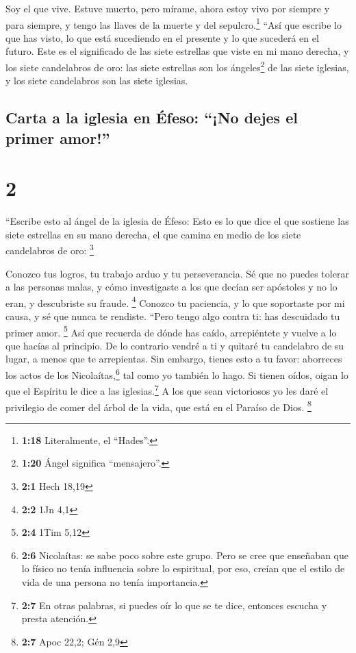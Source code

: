  Soy el que vive. Estuve muerto, pero mírame, ahora estoy
vivo por siempre y para siempre, y tengo las llaves de la muerte y del
sepulcro.\footnote{\textbf{1:18} Literalmente, el ``Hades''.}
 ``Así que escribe lo que has visto, lo que está
sucediendo en el presente y lo que sucederá en el futuro.
 Este es el significado de las siete estrellas que viste
en mi mano derecha, y los siete candelabros de oro: las siete estrellas
son los ángeles\footnote{\textbf{1:20} Ángel significa ``mensajero''.}
de las siete iglesias, y los siete candelabros son las siete iglesias.

\hypertarget{carta-a-la-iglesia-en-uxe9feso-no-dejes-el-primer-amor}{%
\subsection{Carta a la iglesia en Éfeso: ``¡No dejes el primer
amor!''}\label{carta-a-la-iglesia-en-uxe9feso-no-dejes-el-primer-amor}}

\hypertarget{section-1}{%
\section{2}\label{section-1}}

 ``Escribe esto al ángel de la iglesia de Éfeso: Esto es
lo que dice el que sostiene las siete estrellas en su mano derecha, el
que camina en medio de los siete candelabros de oro: \footnote{\textbf{2:1}
  Hech 18,19}

 Conozco tus logros, tu trabajo arduo y tu perseverancia.
Sé que no puedes tolerar a las personas malas, y cómo investigaste a los
que decían ser apóstoles y no lo eran, y descubriste su fraude.
\footnote{\textbf{2:2} 1Jn 4,1}  Conozco tu paciencia, y
lo que soportaste por mi causa, y sé que nunca te rendiste.
 ``Pero tengo algo contra ti: has descuidado tu primer
amor. \footnote{\textbf{2:4} 1Tim 5,12}  Así que recuerda
de dónde has caído, arrepiéntete y vuelve a lo que hacías al principio.
De lo contrario vendré a ti y quitaré tu candelabro de su lugar, a menos
que te arrepientas.  Sin embargo, tienes esto a tu favor:
aborreces los actos de los Nicolaítas,\footnote{\textbf{2:6} Nicolaítas:
  se sabe poco sobre este grupo. Pero se cree que enseñaban que lo
  físico no tenía influencia sobre lo espiritual, por eso, creían que el
  estilo de vida de una persona no tenía importancia.} tal como yo
también lo hago.  Si tienen oídos, oigan lo que el
Espíritu le dice a las iglesias.\footnote{\textbf{2:7} En otras
  palabras, si puedes oír lo que se te dice, entonces escucha y presta
  atención.} A los que sean victoriosos yo les daré el privilegio de
comer del árbol de la vida, que está en el Paraíso de Dios. \footnote{\textbf{2:7}
  Apoc 22,2; Gén 2,9}

